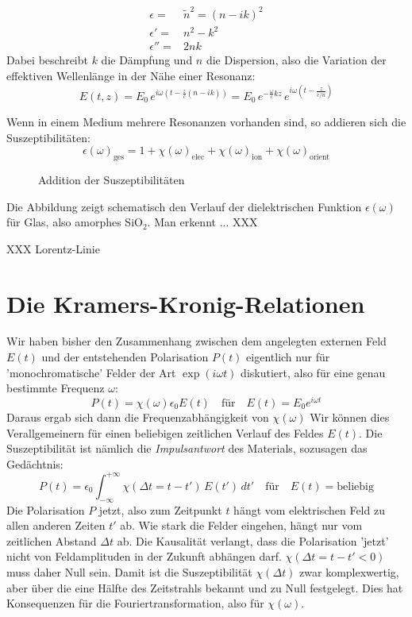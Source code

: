 \begin{align}
 \epsilon = & \tilde{n}^2 = (n - i k)^2 \\
  \epsilon' =& n^2 - k^2 \\
 \epsilon'' = & 2 n k
\end{align}
Dabei beschreibt $k$ die Dämpfung und $n$ die Dispersion, also die Variation der effektiven Wellenlänge in der Nähe einer Resonanz:
\begin{equation}
E(t,z) = E_0 \, e^{i \omega (t - \frac{z}{c}(n - i k))} = 
 E_0 \, e^{ - \frac{\omega}{c} k z}  
 \, e^{i \omega (t - \frac{z}{c/n} )} 
\end{equation}

Wenn in einem Medium mehrere Resonanzen vorhanden sind, so addieren sich die Suszeptibilitäten:
\begin{equation}
\epsilon(\omega)_\text{ges} = 1 + \chi(\omega)_\text{elec} +  \chi(\omega)_\text{ion}  + \chi(\omega)_\text{orient}
\end{equation}

\begin{figure}
\caption{Addition der Suszeptibilitäten}
\end{figure}

Die Abbildung zeigt schematisch den Verlauf der dielektrischen Funktion $\epsilon(\omega)$ für Glas, also amorphes SiO$_2$. Man erkennt ... XXX

XXX Lorentz-Linie


\section{Die Kramers-Kronig-Relationen}

Wir haben bisher den Zusammenhang zwischen dem angelegten externen Feld $E(t)$ und der entstehenden Polarisation $P(t)$ eigentlich nur für 'monochromatische' Felder der Art $\exp(i \omega t)$ diskutiert, also für eine genau bestimmte Frequenz $\omega$:
\begin{equation}
P(t) = \chi(\omega) \epsilon_0 E(t) \quad \text{für} \quad E(t) = E_0 e^{i \omega t}
\end{equation}
Daraus ergab sich dann die Frequenzabhängigkeit von $\chi(\omega)$ Wir können dies Verallgemeinern für einen beliebigen zeitlichen Verlauf des Feldes  $E(t)$. Die Suszeptibilität ist nämlich die  \emph{Impulsantwort} des Materials, sozusagen das Gedächtnis:
\begin{equation}
P(t) = \epsilon_0 \int_{-\infty}^{+\infty} \chi( \Delta t = t - t') \, E(t') \, dt' \quad \text{für} \quad E(t) = \text{beliebig}
\end{equation}
Die Polarisation $P$ jetzt, also zum Zeitpunkt $t$ hängt vom elektrischen Feld zu allen anderen Zeiten $t'$ ab. Wie stark die Felder eingehen, hängt nur vom zeitlichen Abstand $\Delta t$ ab. Die Kausalität verlangt, dass die Polarisation 'jetzt' nicht von Feldamplituden in der Zukunft abhängen darf. $\chi( \Delta t = t - t' < 0) $ muss daher Null sein. Damit ist die Suszeptibilität $\chi( \Delta t ) $ zwar komplexwertig, aber über die eine Hälfte des Zeitstrahls bekannt und zu Null festgelegt. Dies hat Konsequenzen für die Fouriertransformation, also für $\chi(\omega)$.

